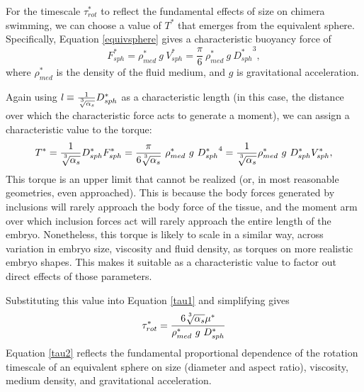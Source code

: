 \documentclass[10pt,a4paper]{article}
\begin{document}
For the timescale $\tau^*_{rot}$ to reflect the fundamental effects of size on chimera swimming, we can choose a value of $T^*$ that emerges from the equivalent sphere.
Specifically, Equation \ref{equivsphere} gives a characteristic buoyancy force of
\begin{equation}\label{charF}
	F_{sph}^* = \rho_{med}^* ~ g ~ V_{sph}^* = \frac{\pi}{6} ~ \rho_{med}^* ~ g ~ {D_{sph}^*}^3,
\end{equation} 
where $\rho_{med}^*$ is the density of the fluid medium, and $g$ is gravitational acceleration.

Again using $\mathit{l} \equiv \frac{1}{\sqrt[\uproot{5}3]{\alpha_s}} D_{sph}^*$ as a characteristic length (in this case, the distance over which the characteristic force acts to generate a moment), we can assign a characteristic value to the torque:
\begin{equation}\label{charT}
	T^* = \frac{1}{\sqrt[\uproot{5}3]{\alpha_s}} D_{sph}^* F_{sph}^* = \frac{\pi}{6 \sqrt[\uproot{5}3]{\alpha_s}} ~ \rho_{med}^* ~ g ~ {D_{sph}^*}^4 = \frac{1}{\sqrt[\uproot{5}3]{\alpha_s}} \rho_{med}^* ~ g ~ D_{sph}^* V_{sph}^*,
\end{equation} 
This torque is an upper limit that cannot be realized (or, in most reasonable geometries, even approached).
This is because the body forces generated by inclusions will rarely approach the body force of the tissue, and the moment arm over which inclusion forces act will rarely approach the entire length of the embryo. 
Nonetheless, this torque is likely to scale in a similar way, across variation in embryo size, viscosity and fluid density, as torques on more realistic embryo shapes. 
This makes it suitable as a characteristic value to factor out direct effects of those parameters.

Substituting this value into Equation \ref{tau1} and simplifying gives
\begin{equation}\label{tau2}
	\tau^*_{rot} = \frac{6 \sqrt[\uproot{5}3]{\alpha_s} \mu^*}{\rho^*_{med} ~ g ~ D_{sph}^*}
\end{equation}
Equation \ref{tau2} reflects the fundamental proportional dependence of the rotation timescale of an equivalent sphere on size (diameter and aspect ratio), viscosity, medium density, and gravitational acceleration.
\end{document}
